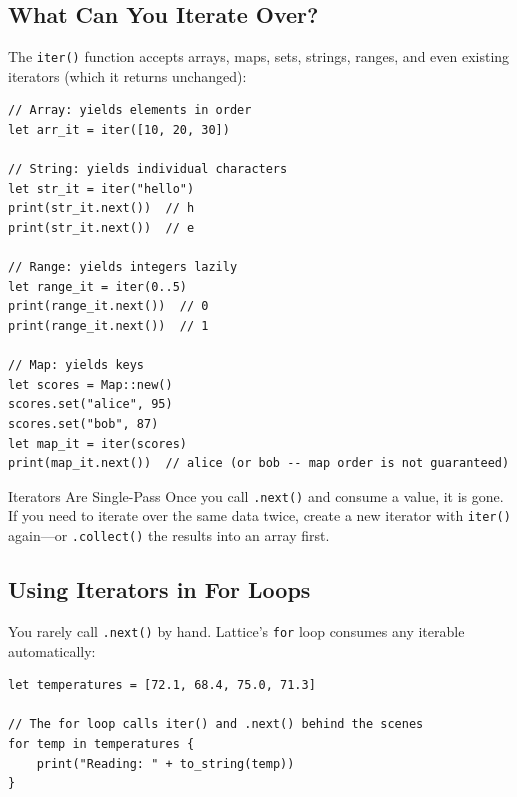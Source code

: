 \subsection{What Can You Iterate Over?}\label{subsec:iterable-types}

The \lstinline|iter()| function accepts arrays, maps, sets, strings, ranges, and even existing iterators (which it returns unchanged):

\begin{lstlisting}[language=Lattice, caption={Creating iterators from different collections}]
// Array: yields elements in order
let arr_it = iter([10, 20, 30])

// String: yields individual characters
let str_it = iter("hello")
print(str_it.next())  // h
print(str_it.next())  // e

// Range: yields integers lazily
let range_it = iter(0..5)
print(range_it.next())  // 0
print(range_it.next())  // 1

// Map: yields keys
let scores = Map::new()
scores.set("alice", 95)
scores.set("bob", 87)
let map_it = iter(scores)
print(map_it.next())  // alice (or bob -- map order is not guaranteed)
\end{lstlisting}

\begin{notebox}{Iterators Are Single-Pass}
Once you call \lstinline|.next()| and consume a value, it is gone.
If you need to iterate over the same data twice, create a new iterator with \lstinline|iter()| again---or \lstinline|.collect()| the results into an array first.
\end{notebox}

\subsection{Using Iterators in For Loops}\label{subsec:iter-for-loops}

You rarely call \lstinline|.next()| by hand.
Lattice's \lstinline|for| loop consumes any iterable automatically:

\begin{lstlisting}[language=Lattice, caption={Iterators and for loops}]
let temperatures = [72.1, 68.4, 75.0, 71.3]

// The for loop calls iter() and .next() behind the scenes
for temp in temperatures {
    print("Reading: " + to_string(temp))
}
\end{lstlisting}

